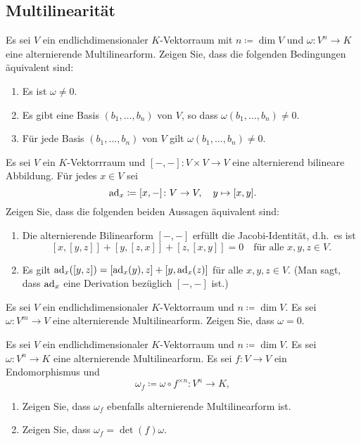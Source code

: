 \subsection{Multilinearität}


\begin{question}
  Es sei $V$ ein endlichdimensionaler $K$-Vektorraum mit $n \coloneqq \dim V$ und $\omega \colon V^n \to K$ eine alternierende Multilinearform.
  Zeigen Sie, dass die folgenden Bedingungen äquivalent sind:
  \begin{enumerate}
    \item
      Es ist $\omega \neq 0$.
    \item
      Es gibt eine Basis $(b_1, \dotsc, b_n)$ von $V$, so dass $\omega(b_1, \dotsc, b_n) \neq 0$.
    \item
      Für jede Basis $(b_1, \dotsc, b_n)$ von $V$ gilt $\omega(b_1, \dotsc, b_n) \neq 0$.
  \end{enumerate}
\end{question}


\begin{question}
  Es sei $V$ ein $K$-Vektorrraum und $[-,-] \colon V \times V \to V$ eine alternierend bilineare Abbildung.
  Für jedes $x \in V$ sei
  \[
    \operatorname{ad}_x \coloneqq [x,-] \colon V \to V, \quad y \mapsto [x,y].
  \]
  Zeigen Sie, dass die folgenden beiden Aussagen äquivalent sind:
  \begin{enumerate}
    \item
      Die alternierende Bilinearform $[-,-]$ erfüllt die Jacobi-Identität, d.h.\ es ist
      \[
        [x,[y,z]] + [y,[z,x]] + [z,[x,y]] = 0
        \quad
        \text{für alle $x, y, z \in V$}.
      \]
    \item
      Es gilt $\operatorname{ad}_x([y,z]) = [\operatorname{ad}_x(y), z] + [y, \operatorname{ad}_x(z)]$ für alle $x, y, z \in V$.
      (Man sagt, dass $\operatorname{ad}_x$ eine Derivation bezüglich $[-,-]$ ist.)
  \end{enumerate}
\end{question}


\begin{question}
  Es sei $V$ ein endlichdimensionaler $K$-Vektorraum und $n \coloneqq \dim V$.
  Es sei $\omega \colon V^m \to V$ eine alternierende Multilinearform.
  Zeigen Sie, dass $\omega = 0$.
\end{question}


\begin{question}
  Es sei $V$ ein endlichdimensionaler $K$-Vektorraum und $n \coloneqq \dim V$.
  Es sei $\omega \colon V^n \to K$ eine alternierende Multilinearform.
  Es sei $f \colon V \to V$ ein Endomorphismus und
  \[
    \omega_f \coloneqq \omega \circ f^{\times n} \colon V^n \to K,
  \]
  \begin{enumerate}[leftmargin=*]
    \item
      Zeigen Sie, dass $\omega_f$ ebenfalls alternierende Multilinearform ist.
    \item
      Zeigen Sie, dass $\omega_f = \det(f) \omega$.
  \end{enumerate}
\end{question}










